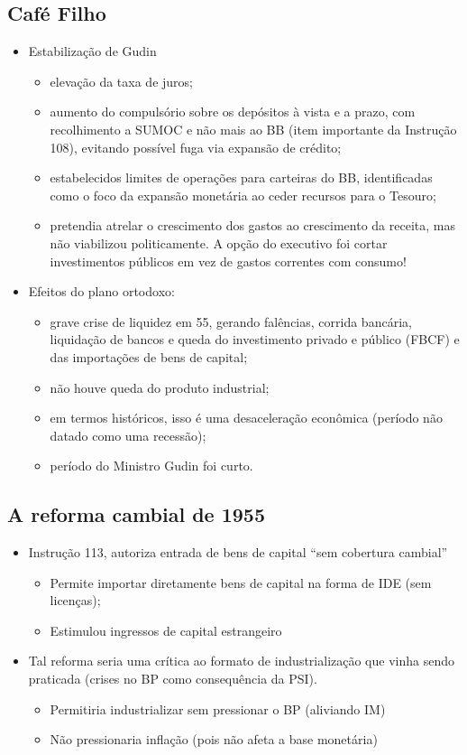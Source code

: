 \documentclass[a4paper,12pt]{article}[abntex2]
\begin{document}
\subsection{Café Filho}
\begin{itemize}
    \item Estabilização de Gudin
    \begin{itemize}
        \item elevação da taxa de juros;
        \item aumento do compulsório sobre os depósitos à vista e a prazo, com recolhimento a SUMOC e não mais ao BB (item importante da Instrução 108), evitando possível fuga via expansão de crédito;
        \item estabelecidos limites de operações para carteiras do BB, identificadas como o foco da expansão monetária ao ceder recursos para o Tesouro;
        \item pretendia atrelar o crescimento dos gastos ao crescimento da receita, mas não viabilizou politicamente. A opção do executivo foi cortar investimentos públicos em vez de gastos correntes com consumo!
    \end{itemize}
    \item Efeitos do plano ortodoxo:
    \begin{itemize}
        \item grave crise de liquidez em 55, gerando falências, corrida bancária, liquidação de bancos e queda do investimento privado e público (FBCF) e das importações de bens de
capital;
\item não houve queda do produto industrial;
\item em termos históricos, isso é uma desaceleração econômica (período não datado como uma recessão);
\item período do Ministro Gudin foi curto.
    \end{itemize}
\end{itemize}

\subsection{A reforma cambial de 1955}
\begin{itemize}
    \item Instrução 113, autoriza entrada de bens de capital “sem cobertura cambial”
    \begin{itemize}
        \item Permite importar diretamente bens de capital na forma de IDE (sem licenças);
        \item Estimulou ingressos de capital estrangeiro
    \end{itemize}
    \item Tal reforma seria uma crítica ao formato de industrialização que vinha sendo praticada (crises no BP como consequência da PSI).
    \begin{itemize}
        \item Permitiria industrializar sem pressionar o BP (aliviando IM)
        \item Não pressionaria inflação (pois não afeta a base monetária)
    \end{itemize}
\end{itemize}
\end{document}
